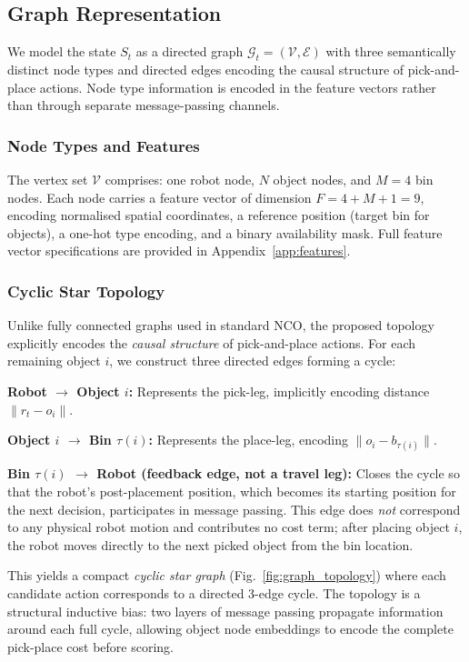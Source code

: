 \documentclass[conference]{IEEEtran}
\begin{document}
\subsection{Graph Representation}

We model the state $S_t$ as a directed graph $\mathcal{G}_t = (\mathcal{V}, \mathcal{E})$ with three semantically distinct node types and directed edges encoding the causal structure of pick-and-place actions. Node type information is encoded in the feature vectors rather than through separate message-passing channels.

\subsubsection{Node Types and Features}
The vertex set $\mathcal{V}$ comprises: one robot node, $N$ object nodes, and $M{=}4$ bin nodes. Each node carries a feature vector of dimension $F = 4 + M + 1 = 9$, encoding normalised spatial coordinates, a reference position (target bin for objects), a one-hot type encoding, and a binary availability mask. Full feature vector specifications are provided in Appendix~\ref{app:features}.

\subsubsection{Cyclic Star Topology}\label{sec:topology}
Unlike fully connected graphs used in standard NCO, the proposed topology explicitly encodes the \emph{causal structure} of pick-and-place actions. For each remaining object $i$, we construct three directed edges forming a cycle:

\textbf{Robot $\to$ Object $i$:} Represents the pick-leg, implicitly encoding distance $\lVert r_t - o_i \rVert$.

\textbf{Object $i$ $\to$ Bin $\tau(i)$:} Represents the place-leg, encoding $\lVert o_i - b_{\tau(i)} \rVert$.

\textbf{Bin $\tau(i)$ $\to$ Robot (feedback edge, not a travel leg):} Closes the cycle so that the robot's post-placement position, which becomes its starting position for the next decision, participates in message passing. This edge does \emph{not} correspond to any physical robot motion and contributes no cost term; after placing object $i$, the robot moves directly to the next picked object from the bin location.

This yields a compact \emph{cyclic star graph} (Fig.~\ref{fig:graph_topology}) where each candidate action corresponds to a directed 3-edge cycle. The topology is a structural inductive bias: two layers of message passing propagate information around each full cycle, allowing object node embeddings to encode the complete pick-place cost before scoring.
\end{document}
